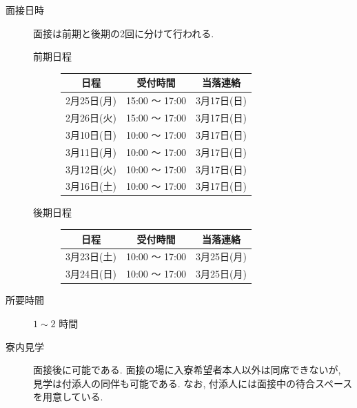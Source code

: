 \documentclass[10pt,b5jsbook,dvips,dvipdfmx,openany]{jsbook}
\theoremstyle{definition}
\begin{document}
		\begin{description}
		\item[面接日時] 面接は前期と後期の2回に分けて行われる. %

			\begin{description}
				\item[前期日程]
					\begin{table}[]
					\begin{tabular}{|c|c|c|}
					\hline
					日程       & 受付時間          & 当落連絡     \\ \hline
					2月25日(月) & 15:00 〜 17:00 & 3月17日(日) \\ \hline
					2月26日(火) & 15:00 〜 17:00 & 3月17日(日) \\ \hline
					3月10日(日) & 10:00 〜 17:00 & 3月17日(日) \\ \hline
					3月11日(月) & 10:00 〜 17:00 & 3月17日(日) \\ \hline
					3月12日(火) & 10:00 〜 17:00 & 3月17日(日) \\ \hline
					3月16日(土) & 10:00 〜 17:00 & 3月17日(日) \\ \hline
					\end{tabular}
					\end{table}
				\item[後期日程]
					\begin{table}[]
					\begin{tabular}{|c|c|c|}
					\hline
					日程       & 受付時間          & 当落連絡     \\ \hline
					3月23日(土) & 10:00 〜 17:00 & 3月25日(月) \\ \hline
					3月24日(日) & 10:00 〜 17:00 & 3月25日(月) \\ \hline
					\end{tabular}
					\end{table}
			\end{description}

		\item[所要時間] $1 \sim 2 $ 時間
		\item[寮内見学] 面接後に可能である. 面接の場に入寮希望者本人以外は同席できないが, 見学は付添人の同伴も可能である. なお, 付添人には面接中の待合スペースを用意している.
		\end{description}
\end{document}
